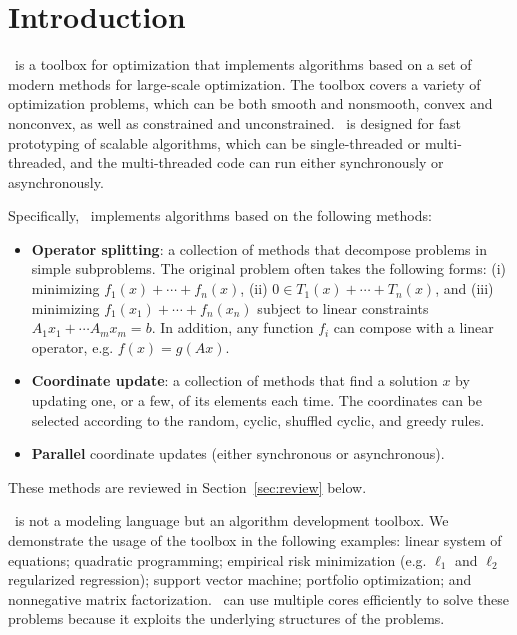 \section{Introduction}
\pkg~is a toolbox for optimization that implements algorithms based on a set of modern methods for large-scale optimization. The toolbox covers a variety of optimization problems, which can  be both smooth and nonsmooth, convex and nonconvex, as well as constrained and unconstrained.  \pkg~is designed for fast prototyping of scalable algorithms, which can be  single-threaded or multi-threaded, and the multi-threaded code can run either synchronously or asynchronously.

Specifically, \pkg~implements  algorithms based on  the following methods:
\begin{itemize}
\item \textbf{Operator splitting}: a collection of methods that decompose problems in simple subproblems. The original problem often takes the following forms: (i) minimizing $f_1(x)+\cdots+f_n(x)$, (ii) $0\in T_1(x)+\cdots +T_n(x)$, and (iii) minimizing $f_1(x_1)+\cdots+f_n(x_n)$ subject to linear constraints $A_1 x_1+\cdots A_m x_m=b$. In addition, any function $f_i$ can compose with a linear operator, e.g. $f(x) = g(Ax)$.

\item \textbf{Coordinate update}: a collection of methods that find a solution $x$ by updating one, or a few, of its elements each time. The coordinates can be selected according to the random, cyclic, shuffled cyclic, and greedy rules.

\item \textbf{Parallel} %
coordinate updates (either synchronous or asynchronous).
\end{itemize}
These methods are reviewed in Section~\ref{sec:review} below.

\pkg~is not a modeling language but an algorithm development toolbox. %
We demonstrate the usage of the toolbox in the following examples:
 linear system of equations;
quadratic programming;
empirical risk minimization (e.g. $\ell_1$ and $\ell_2$ regularized  regression);
support vector machine;
portfolio optimization;
and nonnegative matrix factorization. \pkg~can use multiple cores efficiently to solve these  problems because it exploits the underlying structures of the problems. %

